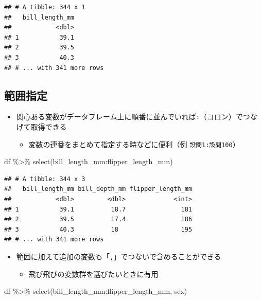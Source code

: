 \documentclass[
  xelatex,ja=standard, b5paper]{bxjsbook}
\newenvironment{Shaded}{\begin{snugshade}}{\end{snugshade}}
\newcommand{\FunctionTok}[1]{\textcolor[rgb]{0.00,0.00,0.00}{#1}}
\newcommand{\NormalTok}[1]{#1}
\newcommand{\SpecialCharTok}[1]{\textcolor[rgb]{0.00,0.00,0.00}{#1}}
\providecommand{\tightlist}{%
  \setlength{\itemsep}{0pt}\setlength{\parskip}{0pt}}
\begin{document}
\begin{verbatim}
## # A tibble: 344 x 1
##   bill_length_mm
##            <dbl>
## 1           39.1
## 2           39.5
## 3           40.3
## # ... with 341 more rows
\end{verbatim}

\hypertarget{select-range}{%
\subsection{範囲指定}\label{select-range}}

\begin{itemize}
\tightlist
\item
  関心ある変数がデータフレーム上に順番に並んでいれば\texttt{:}（コロン）でつなげて取得できる

  \begin{itemize}
  \tightlist
  \item
    変数の連番をまとめて指定する時などに便利（例 \texttt{設問1:設問100}）
  \end{itemize}
\end{itemize}

\begin{Shaded}
\begin{Highlighting}[]
\NormalTok{df }\SpecialCharTok{\%\textgreater{}\%} 
  \FunctionTok{select}\NormalTok{(bill\_length\_mm}\SpecialCharTok{:}\NormalTok{flipper\_length\_mm)}
\end{Highlighting}
\end{Shaded}

\begin{verbatim}
## # A tibble: 344 x 3
##   bill_length_mm bill_depth_mm flipper_length_mm
##            <dbl>         <dbl>             <int>
## 1           39.1          18.7               181
## 2           39.5          17.4               186
## 3           40.3          18                 195
## # ... with 341 more rows
\end{verbatim}

\begin{itemize}
\tightlist
\item
  範囲に加えて追加の変数も「\texttt{,}」でつないで含めることができる

  \begin{itemize}
  \tightlist
  \item
    飛び飛びの変数群を選びたいときに有用
  \end{itemize}
\end{itemize}

\begin{Shaded}
\begin{Highlighting}[]
\NormalTok{df }\SpecialCharTok{\%\textgreater{}\%} 
  \FunctionTok{select}\NormalTok{(bill\_length\_mm}\SpecialCharTok{:}\NormalTok{flipper\_length\_mm, sex)}
\end{Highlighting}
\end{Shaded}
\end{document}
